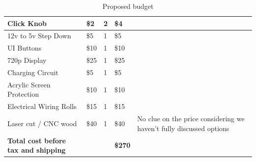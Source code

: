 \begin{table}[h!]
{\begin{tabular}{|l|l|l|l|l|}
    Click Knob                                    & \$2             & 2                   & \$4              &                                                                       \\ \hline
    12v to 5v Step Down                           & \$5             & 1                   & \$5              &                                                                       \\ \hline
    UI Buttons                                    & \$10            & 1                   & \$10             &                                                                       \\ \hline
    720p Display                                  & \$25            & 1                   & \$25             &                                                                       \\ \hline
    Charging Circuit                              & \$5             & 1                   & \$5              &                                                                       \\ \hline
    Acrylic Screen Protection                     & \$10            & 1                   & \$10             &                                                                       \\ \hline
    Electrical Wiring Rolls                       & \$15            & 1                   & \$15             &                                                                       \\ \hline
    Laser cut / CNC wood                          & \$40            & 1                   & \$40             & No clue on the price considering we haven't fully discussed options   \\ \hline
    \textbf{Total cost before tax and shipping }  &                 &                     & \textbf{\$270 }  &                                                                       \\ \hline
  \end{tabular}}
  \caption{Proposed budget}
  \label{Tab:budget}
\end{table}
